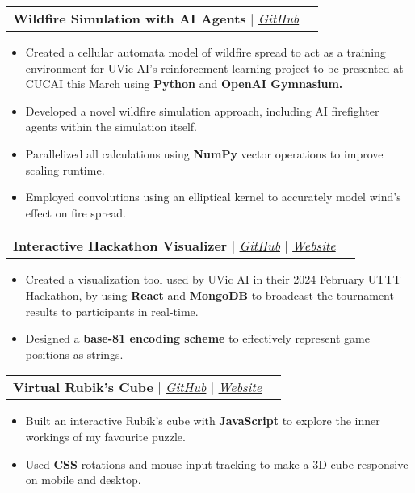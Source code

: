 \documentclass[letterpaper,11pt]{article}
\makeatletter
\newcommand{\resumeItem}[1]{
  \item\small{
    {#1 \vspace{-2pt}}
  }
}
\newcommand{\resumeProjectHeading}[2]{
    \vspace{5pt}\item
    \begin{tabular*}{0.97\textwidth}{l@{\extracolsep{\fill}}r}
      \small#1 & #2 \\
    \end{tabular*}\vspace{-7pt}
}
\newcommand{\resumeItemListStart}{\begin{itemize}}
\newcommand{\resumeItemListEnd}{\end{itemize}\vspace{-5pt}}
\makeatother
\begin{document}

      \resumeProjectHeading
        {\textbf{Wildfire Simulation with AI Agents} $|$ \emph{\href{https://github.com/uvicaiclub/WildfireManagementRL}{\color{blue}GitHub}}}{}
          \resumeItemListStart
            \resumeItem{Created a cellular automata model of wildfire spread to act as a training environment for UVic AI’s reinforcement learning project to be presented at CUCAI this March using \textbf{Python} and \textbf{OpenAI Gymnasium.}}
            \resumeItem{Developed a novel wildfire simulation approach, including AI firefighter agents within the simulation itself.}
            \resumeItem{Parallelized all calculations using \textbf{NumPy} vector operations to improve scaling runtime.}
            \resumeItem{Employed convolutions using an elliptical kernel to accurately model wind's effect on fire spread.}
          \resumeItemListEnd
    
      \resumeProjectHeading
        {\textbf{Interactive Hackathon Visualizer} $|$ \emph{\href{https://github.com/NathanPannell/uttt-visual}{\color{blue}GitHub}} $|$
        \emph{\href{https://uttt-visual.vercel.app }{\color{blue}Website}}}{}
          \resumeItemListStart
            \resumeItem{Created a visualization tool used by UVic AI in their 2024 February UTTT Hackathon, by using \textbf{React} and \textbf{MongoDB} to broadcast the tournament results to participants in real-time.}
            \resumeItem{Designed a \textbf{base-81 encoding scheme} to effectively represent game positions as strings.}
          \resumeItemListEnd
		  
      \resumeProjectHeading
        {\textbf{Virtual Rubik's Cube} $|$ \emph{\href{https://github.com/NathanPannell/virtual-cube}{\color{blue}GitHub}} $|$
        \emph{\href{https://nathanpannell.github.io/virtual-cube/cube.html}{\color{blue}Website}}}{}
          \resumeItemListStart
            \resumeItem{Built an interactive Rubik's cube with \textbf{JavaScript} to explore the inner workings of my favourite puzzle.}
            \resumeItem{Used \textbf{CSS} rotations and mouse input tracking to make a 3D cube responsive on mobile and desktop.}
          \resumeItemListEnd
		  
\end{document}
